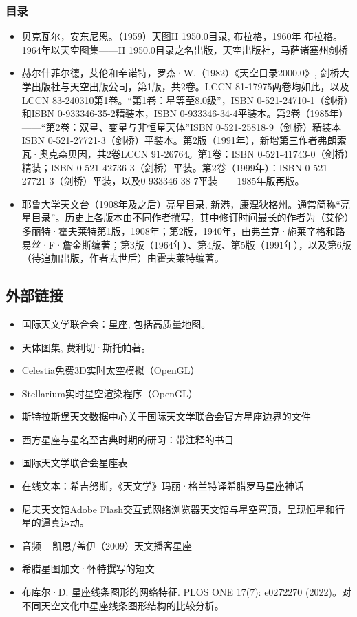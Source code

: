 \subsubsection{目录}
\begin{itemize}
\item 贝克瓦尔，安东尼恩。（1959）天图II 1950.0目录, 布拉格，1960年 布拉格。1964年以天空图集——II 1950.0目录之名出版，天空出版社，马萨诸塞州剑桥
\item 赫尔什菲尔德，艾伦和辛诺特，罗杰·W.（1982）《天空目录2000.0》, 剑桥大学出版社与天空出版公司，第1版，共2卷。LCCN 81-17975两卷均如此，以及LCCN 83-240310第1卷。“第1卷：星等至8.0级”，ISBN 0-521-24710-1（剑桥）和ISBN 0-933346-35-2精装本，ISBN 0-933346-34-4平装本。第2卷（1985年）——“第2卷：双星、变星与非恒星天体”ISBN 0-521-25818-9（剑桥）精装本ISBN 0-521-27721-3（剑桥）平装本。第2版（1991年），新增第三作者弗朗索瓦·奥克森贝因，共2卷LCCN 91-26764。第1卷：ISBN 0-521-41743-0（剑桥）精装；ISBN 0-521-42736-3（剑桥）平装。第2卷（1999年）：ISBN 0-521-27721-3（剑桥）平装，以及0-933346-38-7平装——1985年版再版。
\item 耶鲁大学天文台（1908年及之后）亮星目录, 新港，康涅狄格州。通常简称“亮星目录”。历史上各版本由不同作者撰写，其中修订时间最长的作者为（艾伦）多丽特·霍夫莱特第1版，1908年；第2版，1940年，由弗兰克·施莱辛格和路易丝·F·詹金斯编著；第3版（1964年）、第4版、第5版（1991年），以及第6版（待追加出版，作者去世后）由霍夫莱特编著。
\end{itemize}
\subsection{外部链接}
\begin{itemize}
\item 国际天文学联合会：星座, 包括高质量地图。
\item 天体图集, 费利切·斯托帕著。
\item Celestia免费3D实时太空模拟（OpenGL）
\item Stellarium实时星空渲染程序（OpenGL）
\item 斯特拉斯堡天文数据中心关于国际天文学联合会官方星座边界的文件
\item 西方星座与星名至古典时期的研习：带注释的书目
\item 国际天文学联合会星座表
\item 在线文本：希吉努斯，《天文学》玛丽·格兰特译希腊罗马星座神话
\item 尼夫天文馆Adobe Flash交互式网络浏览器天文馆与星空穹顶，呈现恒星和行星的逼真运动。
\item 音频 – 凯恩/盖伊（2009）天文播客星座
\item 希腊星图加文·怀特撰写的短文
\item 布库尔·D. 星座线条图形的网络特征. PLOS ONE 17(7): e0272270 (2022)。对不同天空文化中星座线条图形结构的比较分析。
\end{itemize}